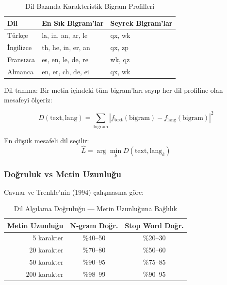 \begin{table}[H]
\centering
\caption{Dil Baz{\i}nda Karakteristik Bigram Profilleri}
\label{tab:bigram-profiles}
\begin{tabular}{lll}
\toprule
\color{chapterBlue}\textbf{Dil} & \color{chapterBlue}\textbf{En S{\i}k Bigram'lar} & \color{chapterBlue}\textbf{Seyrek Bigram'lar} \\
\midrule
T\"{u}rk\c{c}e    & la, in, an, ar, le & qx, wk \\
\.{I}ngilizce & th, he, in, er, an & qx, zp \\
Frans{\i}zca & es, en, le, de, re & wk, qz \\
Almanca   & en, er, ch, de, ei & qx, wk \\
\bottomrule
\end{tabular}
\end{table}

Dil tan{\i}ma: Bir metin i\c{c}indeki t\"{u}m bigram'lar{\i} say{\i}p her dil profiline olan mesafeyi \"{o}l\c{c}eriz:

\begin{equation}
\label{eq:bigram-distance}
D(\text{text}, \text{lang}) = \sum_{\text{bigram}} \left| f_{\text{text}}(\text{bigram}) - f_{\text{lang}}(\text{bigram}) \right|^2
\end{equation}

En d\"{u}\c{s}\"{u}k mesafeli dil se\c{c}ilir:
\begin{equation}
\label{eq:argmin-lang}
\hat{L} = \arg\min_{k} D(\text{text}, \text{lang}_k)
\end{equation}

\subsubsection{Do\u{g}ruluk vs Metin Uzunlu\u{g}u}

Cavnar ve Trenkle'nin (1994) \c{c}al{\i}\c{s}mas{\i}na g\"{o}re:

\begin{table}[H]
\centering
\caption{Dil Alg{\i}lama Do\u{g}rulu\u{g}u --- Metin Uzunlu\u{g}una Ba\u{g}l{\i}l{\i}k}
\label{tab:accuracy-vs-length}
\begin{tabular}{rcc}
\toprule
\color{chapterBlue}\textbf{Metin Uzunlu\u{g}u} & \color{chapterBlue}\textbf{N-gram Do\u{g}r.} & \color{chapterBlue}\textbf{Stop Word Do\u{g}r.} \\
\midrule
5 karakter   & \%40--50 & \%20--30 \\
20 karakter  & \%70--80 & \%50--60 \\
50 karakter  & \%90--95 & \%75--85 \\
200 karakter & \%98--99 & \%90--95 \\
\bottomrule
\end{tabular}
\end{table}

